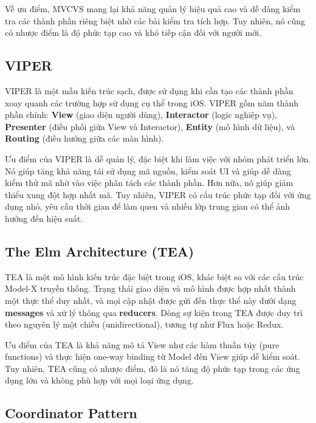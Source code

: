   Về ưu điểm, MVCVS mang lại khả năng quản lý hiệu quả cao và dễ dàng kiểm tra các thành phần riêng biệt nhờ các bài kiểm tra tích hợp. Tuy nhiên, nó cũng có nhược điểm là độ phức tạp cao và khó tiếp cận đối với người mới.

  \subsection{VIPER}

\hspace*{0.8cm}VIPER là một mẫu kiến trúc sạch, được sử dụng khi cần tạo các thành phần xoay quanh các trường hợp sử dụng cụ thể trong iOS. VIPER gồm năm thành phần chính: \textbf{View} (giao diện người dùng), \textbf{Interactor} (logic nghiệp vụ), \textbf{Presenter} (điều phối giữa View và Interactor), \textbf{Entity} (mô hình dữ liệu), và \textbf{Routing} (điều hướng giữa các màn hình).

  Ưu điểm của VIPER là dễ quản lý, đặc biệt khi làm việc với nhóm phát triển lớn. Nó giúp tăng khả năng tái sử dụng mã nguồn, kiểm soát UI và giúp dễ dàng kiểm thử mã nhờ vào việc phân tách các thành phần. Hơn nữa, nó giúp giảm thiểu xung đột hợp nhất mã. Tuy nhiên, VIPER có cấu trúc phức tạp đối với ứng dụng nhỏ, yêu cầu thời gian để làm quen và nhiều lớp trung gian có thể ảnh hưởng đến hiệu suất.

  \subsection{The Elm Architecture (TEA)}

\hspace*{0.8cm}TEA là một mô hình kiến trúc đặc biệt trong iOS, khác biệt so với các cấu trúc Model-X truyền thống. Trạng thái giao diện và mô hình được hợp nhất thành một thực thể duy nhất, và mọi cập nhật được gửi đến thực thể này dưới dạng \textbf{messages} và xử lý thông qua \textbf{reducers}. Dòng sự kiện trong TEA được duy trì theo nguyên lý một chiều (unidirectional), tương tự như Flux hoặc Redux.

  Ưu điểm của TEA là khả năng mô tả View như các hàm thuần túy (pure functions) và thực hiện one-way binding từ Model đến View giúp dễ kiểm soát. Tuy nhiên, TEA cũng có nhược điểm, đó là nó tăng độ phức tạp trong các ứng dụng lớn và không phù hợp với mọi loại ứng dụng.

  \subsection{Coordinator Pattern}

